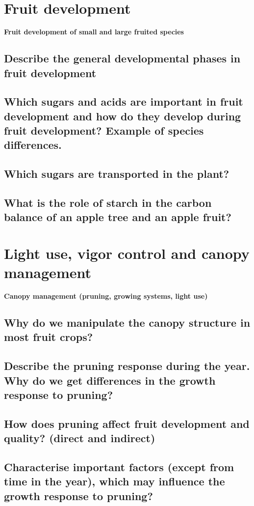 \section{Fruit development}
\textbf{Fruit development of small and large fruited species}

\subsection{Describe the general developmental phases in fruit development}
\subsection{Which sugars and acids are important in fruit development and how 
do they develop during fruit development? Example of species 
differences.}
\subsection{Which sugars are transported in the plant?}
\subsection{What is the role of starch in the carbon balance of an apple tree and 
an apple fruit?}


\vspace{1em}
\section{Light use, vigor control and canopy management}
\textbf{Canopy management (pruning, growing systems, light use)}

\subsection{Why do we manipulate the canopy structure in most fruit crops?}
\subsection{Describe the pruning response during the year. Why do we get 
differences in the growth response to pruning?}
\subsection{How does pruning affect fruit development and quality? (direct and 
indirect)}
\subsection{Characterise important factors (except from time in the year), which 
may influence the growth response to pruning?}


